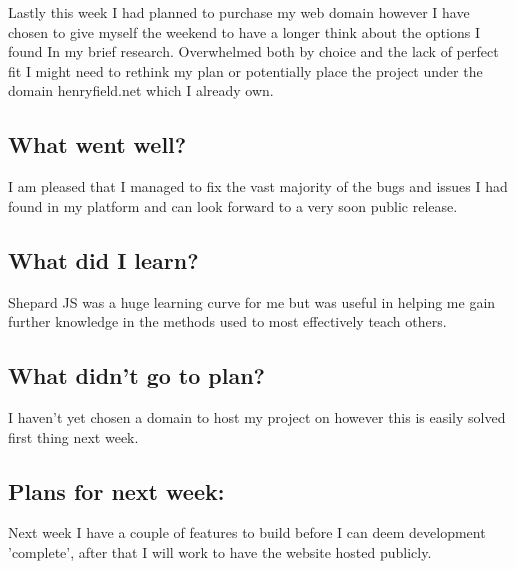 Lastly this week I had planned to purchase my web domain however I have chosen to give myself the weekend to have a longer think about the options I found In my brief research. Overwhelmed both by choice and the lack of perfect fit I might need to rethink my plan or potentially place the project under the domain henryfield.net which I already own.

\subsection*{What went well?}
I am pleased that I managed to fix the vast majority of the bugs and issues I had found in my platform and can look forward to a very soon public release.


\subsection*{What did I learn?}
Shepard JS was a huge learning curve for me but was useful in helping me gain further knowledge in the methods used to most effectively teach others.

\subsection*{What didn't go to plan?}
I haven't yet chosen a domain to host my project on however this is easily solved first thing next week.

\subsection*{Plans for next week:}
Next week I have a couple of features to build before I can deem development 'complete', after that I will work to have the website hosted publicly.
